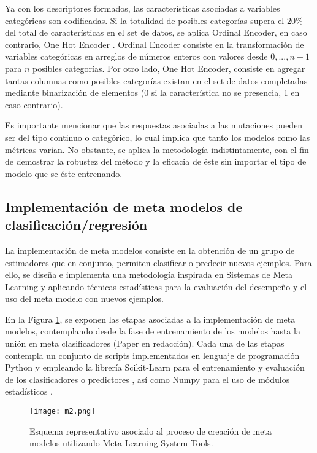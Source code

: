 Ya con los descriptores formados, las características asociadas a variables categóricas son codificadas. Si la totalidad de posibles categorías supera el 20\% del total de características en el set de datos, se aplica Ordinal Encoder, en caso contrario, One Hot Encoder \cite{pedregosa2011scikit}. Ordinal Encoder consiste en la transformación de variables categóricas en arreglos de números enteros con valores desde $0,...,n-1$ para $n$ posibles categorías. Por otro lado, One Hot Encoder, consiste en agregar tantas columnas como posibles categorías existan en el set de datos completadas mediante binarización de elementos (0 si la característica no se presencia, 1 en caso contrario).

Es importante mencionar que las respuestas asociadas a las mutaciones pueden ser del tipo continuo o categórico, lo cual implica que tanto los modelos como las métricas varían. No obstante, se aplica la metodología indistintamente, con el fin de demostrar la robustez del método y la eficacia de éste sin importar el tipo de modelo que se éste entrenando.

\subsection{Implementación de meta modelos de clasificación/regresión}

La implementación de meta modelos consiste en la obtención de un grupo de estimadores que en conjunto, permiten clasificar o predecir nuevos ejemplos. Para ello, se diseña e implementa una metodología inspirada en Sistemas de Meta Learning y aplicando técnicas estadísticas para la evaluación del desempeño y el uso del meta modelo con nuevos ejemplos.

En la Figura \ref{C2:M2}, se exponen las etapas asociadas a la implementación de meta modelos, contemplando desde la fase de entrenamiento de los modelos hasta la unión en meta clasificadores (Paper en redacción). Cada una de las etapas contempla un conjunto de scripts implementados en lenguaje de programación Python y empleando la librería Scikit-Learn para el entrenamiento y evaluación de los clasificadores o predictores \cite{pedregosa2011scikit}, así como Numpy para el uso de módulos estadísticos \cite{doi:10.1109/MCSE.2011.37}.


\begin{figure}[!h]
	\centering
	\texttt{[image: m2.png]}
	\caption{Esquema representativo asociado al proceso de creación de meta modelos utilizando Meta Learning System Tools.}
	\label{C2:M2}
\end{figure}

